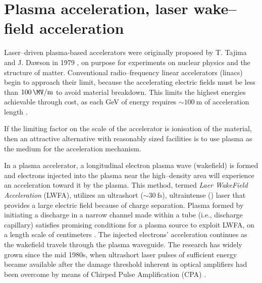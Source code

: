 \documentclass[justified,nofonts,nobib,openany]{tufte-book}
\begin{document}
\section{Plasma acceleration, laser wake--field acceleration}\label{sec:wakefield}
Laser--driven plasma-based accelerators were originally proposed by T. Tajima and J. Dawson in 1979 \cite{Dawson1979}, on purpose for experiments on nuclear physics and the structure of matter. Conventional radio--frequency linear accelerators (linacs) begin to approach their limit, because the accelerating electric fields  must  be  less  than  $\SI{100}{\MV\per \m}$  to  avoid material breakdown. This limits the highest energies achievable through cost, as each \si{\GeV} of energy requires $\sim \SI{100}{\m}$ of acceleration length \cite{Esarey2009PhysicsAccelerators}.

If the limiting factor on the scale of the accelerator is ionisation of the material, then an attractive alternative with reasonably sized facilities is to use plasma as the medium for the acceleration mechanism.

In a plasma accelerator, a longitudinal electron plasma wave (wakefield) is formed and electrons injected into the plasma near the high--density area will experience an acceleration toward it by the plasma. This method, termed \emph{Laer WakeField Acceleration} (LWFA), utilizes an ultrashort ($\sim\SI{30}{\fs}$), ultraintense (\si{\TW}) laser that provides a large electric field because of charge separation. Plasma formed by initiating a discharge in a narrow channel made within a tube (i.e., discharge capillary) satisfies promising conditions for a plasma source to exploit LWFA, on a length scale of centimeters \cite{Gonsalves2019PetawattWaveguide,Leemans2014Multi-GeVRegime}. The injected electrons' acceleration continues as the wakefield travels through the plasma waveguide. The research has widely grown since the mid 1980s, when ultrashort laser pulses of sufficient energy became available after the damage threshold inherent in optical amplifiers had been overcome by means of Chirped Pulse Amplification (CPA) \cite{Strickland1985CompressionPulses}.
\end{document}
